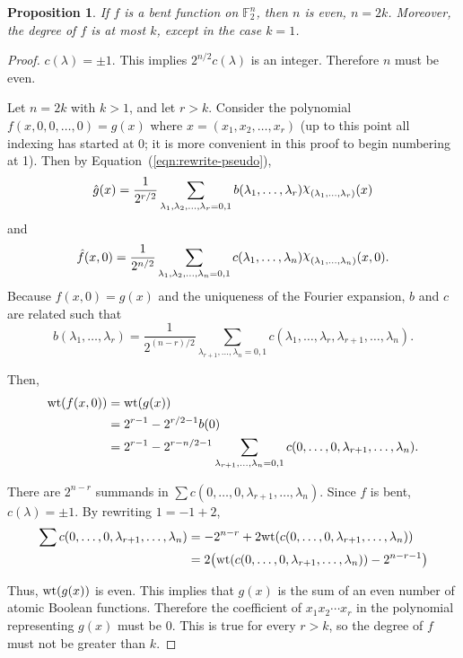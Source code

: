\documentclass[english]{article}
\def\gftwo{\mathbb{F}_2}
\def\Chi{\raisebox{2pt}{$\chi$}}
\theoremstyle{plain}
\newtheorem{proposition}[theorem]{Proposition}%
\theoremstyle{definition}
\theoremstyle{remark}
\begin{document}
\begin{proposition}{\rm \cite{art:r76}}
  If $f$ is a bent function on $\gftwo^n$, then $n$ is even, $n=2k$.
  Moreover,
  the degree of $f$ is at most $k$, except in the case $k=1$.
\end{proposition}
\begin{proof}
  \par $c(\lambda)=\pm1$. This implies $2^{n/2}c(\lambda)$ is an
  integer. Therefore $n$ must be even.
  \par Let $n=2k$ with $k>1$, and let $r>k$. Consider the polynomial
  $f(x,\allowbreak 0,0,\dots,0)=\allowbreak g(x)$ where $x=(x_1,x_2,\dots,x_r)$
  (up to this point all indexing has
  started at 0; it is more convenient in this proof to begin numbering at
  1). Then by Equation~(\ref{eqn:rewrite-pseudo}),
  \[
  \hat{g}(x)=\frac{1}{2^{r/2}}\sum_{\lambda_1,\lambda_2,\dots,\lambda_r=0,1}
    b(\lambda_1,\dots,\lambda_r)\Chi_{(\lambda_1,\ldots,\lambda_r)}(x)
  \]
  and
  \[
  \hat{f}(x,0)=\frac{1}{2^{n/2}}
    \sum_{\lambda_1,\lambda_2,\dots,\lambda_n=0,1}
    c(\lambda_1,\dots,\lambda_n)\Chi_{(\lambda_1,\ldots,\lambda_n)}(x,0).
  \]
  Because $f(x,0)=g(x)$ and the uniqueness of the Fourier expansion, $b$ and
  $c$ are related such that
  \[
  b(\lambda_1,\dots,\lambda_r)
    =\frac{1}{2^{(n-r)/2}}\sum_{\lambda_{r+1},\dots,\lambda_n=0,1}
    c(\lambda_1,\dots,\lambda_r,\lambda_{r+1},\dots,\lambda_n).
  \]
  \par Then,
  \begin{align*}
  {\rm wt}(f(x,0))&={\rm wt}(g(x))\\
    &=2^{r-1}-2^{r/2-1}b(0)\\
    &=2^{r-1}-2^{r-n/2-1}\sum_{\lambda_{r+1},\dots,\lambda_n=0,1}
      c(0,\dots,0,\lambda_{r+1},\dots,\lambda_n).
  \end{align*}
  \par There are $2^{n-r}$ summands in
  $\sum{c(0,\dots,0,\lambda_{r+1},\dots,\lambda_n)}.$ Since $f$ is bent,
  $c(\lambda)=\pm1$. By rewriting $1=-1+2$,
  \begin{align*}
    \sum{c(0,\dots,0,\lambda_{r+1},\dots,\lambda_n)}
      &=-2^{n-r}+2{\rm wt}(c(0,\dots,0,\lambda_{r+1},\dots,\lambda_n))\\
      &=2\big({\rm wt}(c(0,\dots,0,\lambda_{r+1},\dots,\lambda_n))-2^{n-r-1}\big)
  \end{align*}
  \par Thus, ${\rm wt}(g(x))$ is even. This implies that $g(x)$ is the sum of an
  even number of atomic Boolean functions. Therefore the coefficient of
  $x_1x_2\cdots x_r$ in the polynomial representing $g(x)$ must be 0. This
  is true for every $r>k$, so the degree of $f$ must not be greater than
  $k$.
\end{proof}
\end{document}
